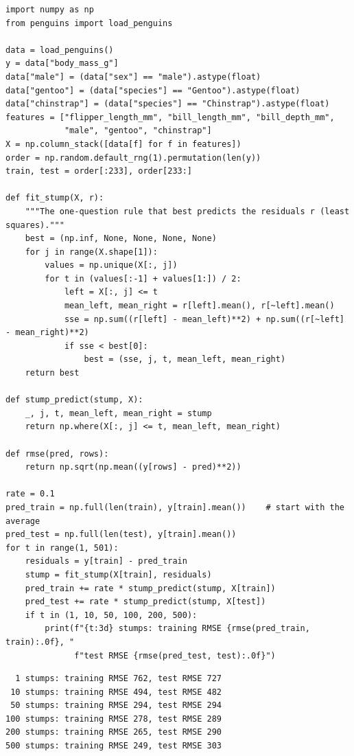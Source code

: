 \begin{verbatim}
import numpy as np
from penguins import load_penguins

data = load_penguins()
y = data["body_mass_g"]
data["male"] = (data["sex"] == "male").astype(float)
data["gentoo"] = (data["species"] == "Gentoo").astype(float)
data["chinstrap"] = (data["species"] == "Chinstrap").astype(float)
features = ["flipper_length_mm", "bill_length_mm", "bill_depth_mm",
            "male", "gentoo", "chinstrap"]
X = np.column_stack([data[f] for f in features])
order = np.random.default_rng(1).permutation(len(y))
train, test = order[:233], order[233:]

def fit_stump(X, r):
    """The one-question rule that best predicts the residuals r (least squares)."""
    best = (np.inf, None, None, None, None)
    for j in range(X.shape[1]):
        values = np.unique(X[:, j])
        for t in (values[:-1] + values[1:]) / 2:
            left = X[:, j] <= t
            mean_left, mean_right = r[left].mean(), r[~left].mean()
            sse = np.sum((r[left] - mean_left)**2) + np.sum((r[~left] - mean_right)**2)
            if sse < best[0]:
                best = (sse, j, t, mean_left, mean_right)
    return best

def stump_predict(stump, X):
    _, j, t, mean_left, mean_right = stump
    return np.where(X[:, j] <= t, mean_left, mean_right)

def rmse(pred, rows):
    return np.sqrt(np.mean((y[rows] - pred)**2))

rate = 0.1
pred_train = np.full(len(train), y[train].mean())    # start with the average
pred_test = np.full(len(test), y[train].mean())
for t in range(1, 501):
    residuals = y[train] - pred_train
    stump = fit_stump(X[train], residuals)
    pred_train += rate * stump_predict(stump, X[train])
    pred_test += rate * stump_predict(stump, X[test])
    if t in (1, 10, 50, 100, 200, 500):
        print(f"{t:3d} stumps: training RMSE {rmse(pred_train, train):.0f}, "
              f"test RMSE {rmse(pred_test, test):.0f}")
\end{verbatim}

\begin{verbatim}
  1 stumps: training RMSE 762, test RMSE 727
 10 stumps: training RMSE 494, test RMSE 482
 50 stumps: training RMSE 294, test RMSE 294
100 stumps: training RMSE 278, test RMSE 289
200 stumps: training RMSE 265, test RMSE 290
500 stumps: training RMSE 249, test RMSE 303
\end{verbatim}

